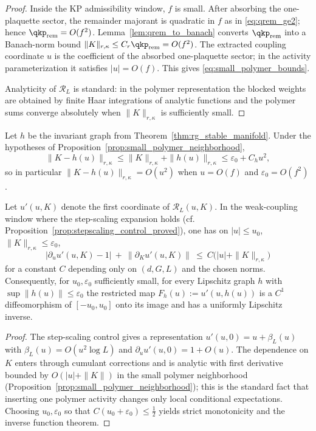 \begin{proof}
Inside the KP admissibility window, $f$ is small.
After absorbing the one-plaquette sector, the remainder majorant is quadratic in $f$ as in \eqref{eq:qrem_ge2}; hence
$\qkp_{\mathrm{rem}}=O(f^2)$.
Lemma~\ref{lem:qrem_to_banach} converts $\qkp_{\mathrm{rem}}$ into a Banach-norm bound $\|K\|_{r,\kappa}\le C_r\qkp_{\mathrm{rem}}=O(f^2)$.
The extracted coupling coordinate $u$ is the coefficient of the absorbed one-plaquette sector; in the activity parameterization it satisfies
$|u|=O(f)$.
This gives \eqref{eq:small_polymer_bounds}.

Analyticity of $\mathcal R_L$ is standard: in the polymer representation the blocked weights are obtained by finite Haar integrations of
analytic functions and the polymer sums converge absolutely when $\|K\|_{r,\kappa}$ is sufficiently small.
\end{proof}

\begin{corollary}
\label{cor:entrance_alignment_invariant_graph}
Let $h$ be the invariant graph from Theorem~\ref{thm:rg_stable_manifold}.
Under the hypotheses of Proposition~\ref{prop:small_polymer_neighborhood},
\[
\|K-h(u)\|_{r,\kappa}\le \|K\|_{r,\kappa}+\|h(u)\|_{r,\kappa}\le \varepsilon_0+C_h u^2,
\]
so in particular $\|K-h(u)\|_{r,\kappa}=O(u^2)$ when $u=O(f)$ and $\varepsilon_0=O(f^2)$.
\end{corollary}


\begin{lemma}\label{lem:coupling_update_invertible}
Let $u'(u,K)$ denote the first coordinate of $\mathcal R_L(u,K)$.
In the weak-coupling window where the step-scaling expansion holds (cf. Proposition~\ref{prop:stepscaling_control_proved}), one has on
$|u|\le u_0$, $\|K\|_{r,\kappa}\le\varepsilon_0$,
\[
\bigl|\partial_u u'(u,K)-1\bigr|\ +\ \|\partial_K u'(u,K)\|\ \le\ C\bigl(|u|+\|K\|_{r,\kappa}\bigr)
\]
for a constant $C$ depending only on $(d,G,L)$ and the chosen norms.
Consequently, for $u_0,\varepsilon_0$ sufficiently small, for every Lipschitz graph $h$ with $\sup\|h(u)\|\le\varepsilon_0$ the restricted map
$F_h(u):=u'(u,h(u))$ is a $C^1$ diffeomorphism of $[-u_0,u_0]$ onto its image and has a uniformly Lipschitz inverse.
\end{lemma}

\begin{proof}
The step-scaling control gives a representation
$u'(u,0)=u+\beta_L(u)$ with $\beta_L(u)=O(u^2\log L)$ and $\partial_u u'(u,0)=1+O(u)$.
The dependence on $K$ enters through cumulant corrections and is analytic with first derivative bounded by $O(|u|+\|K\|)$ in the small
polymer neighborhood (Proposition~\ref{prop:small_polymer_neighborhood}); this is the standard fact that inserting one polymer activity changes
only local conditional expectations.
Choosing $u_0,\varepsilon_0$ so that $C(u_0+\varepsilon_0)\le\tfrac12$ yields strict monotonicity and the inverse function theorem.
\end{proof}
